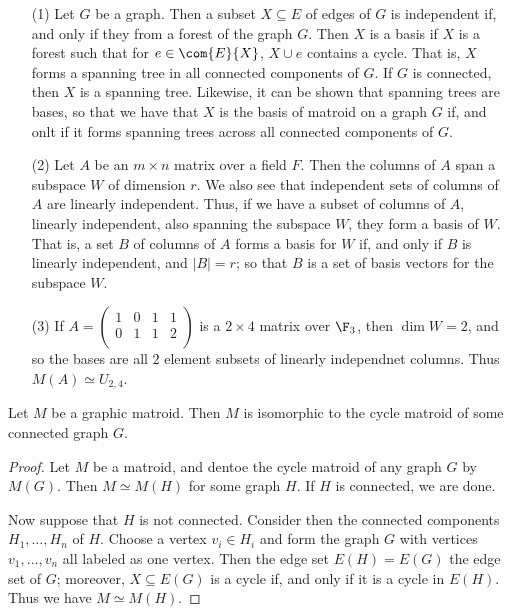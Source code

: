 \begin{example}\label{1.11}
    \begin{enumerate}
        \item[(1)] Let $G$ be a graph. Then a subset $X \subseteq E$ of edges
            of $G$ is independent if, and only if they from a forest of the
            graph $G$. Then $X$ is a basis if  $X$ is a forest such that for
            $e \in \com{E}{X}$, $X \cup e$ contains a cycle. That is, $X$ forms
            a spanning tree in all connected components of  $G$. If  $G$ is
            connected, then $X$ is a spanning tree. Likewise, it can be shown
            that spanning trees are bases, so that we have that  $X$ is the
            basis of matroid on a graph $G$ if, and onlt if it forms spanning
            trees across all connected components of $G$.

        \item [(2)] Let $A$ be an $m \times n$ matrix over a field $F$. Then the
            columns of  $A$ span a subspace  $W$ of dimension  $r$. We also see
            that independent sets of columns of $A$ are linearly independent.
            Thus, if we have a subset of columns of $A$, linearly independent,
            also spanning the subspace $W$, they form a basis of  $W$. That is,
            a set $B$ of columns of  $A$ forms a basis for  $W$ if, and only if
             $B$ is linearly independent, and $|B|=r$; so that $B$ is a set of
             basis vectors for the subspace $W$.

         \item[(3)] If $A=\begin{pmatrix}
                        1 & 0 & 1 & 1 \\
                        0 & 1 & 1 & 2 \\
                      \end{pmatrix}$
                is a $2 \times 4$ matrix over $\F_3$, then $\dim{W}=2$, and so
                the bases are all $2$ element subsets of linearly independnet
                columns. Thus  $M(A) \simeq U_{2,4}$.
    \end{enumerate}
\end{example}

\begin{theorem}\label{1.2.5}
    Let $M$ be a graphic matroid. Then $M$ is isomorphic to the cycle matroid of
    some connected graph $G$.
\end{theorem}
\begin{proof}
    Let $M$ be a matroid, and dentoe the cycle matroid of any graph $G$ by
    $M(G)$. Then $M \simeq M(H)$ for some graph $H$. If  $H$ is connected, we
    are done.

    Now suppose that  $H$ is not connected. Consider then the connected
    components  $H_1, \dots, H_n$ of $H$. Choose a vertex  $v_i \in H_i$ and
    form the graph  $G$ with vertices  $v_1, \dots, v_n$ all labeled as one
    vertex. Then the edge set $E(H)=E(G)$ the edge set of $G$; moreover, $X
    \subseteq E(G)$ is a cycle if, and only if it is a cycle in $E(H)$. Thus we
    have $M \simeq M(H)$.
\end{proof}

